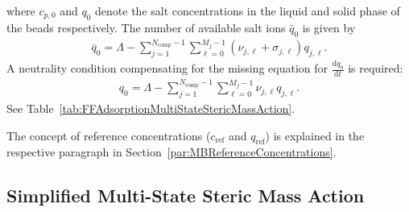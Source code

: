 where $c_{p,0}$ and $q_0$ denote the salt concentrations in the liquid and solid phase of the beads respectively. The number of available salt ions $\bar{q}_0$ is given by
\begin{align*}
  \bar{q}_0 = \Lambda - \sum_{j=1}^{N_{\text{comp}} - 1} \sum_{\ell=0}^{M_j - 1} \left( \nu_{j,\ell} + \sigma_{j,\ell} \right) q_{j,\ell}.
\end{align*}
A neutrality condition compensating for the missing equation for $\frac{\mathrm{d} q_0}{\mathrm{d}t}$ is required:
\begin{align*}
  q_0 = \Lambda - \sum_{j=1}^{N_{\text{comp}} - 1} \sum_{\ell=0}^{M_j - 1} \nu_{j,\ell} q_{j,\ell}.
\end{align*}
See Table~\ref{tab:FFAdsorptionMultiStateStericMassAction}.

The concept of reference concentrations ($c_{\text{ref}}$ and $q_{\text{ref}}$) is explained in the respective paragraph in Section~\ref{par:MBReferenceConcentrations}.

\subsection{Simplified Multi-State Steric Mass Action}

